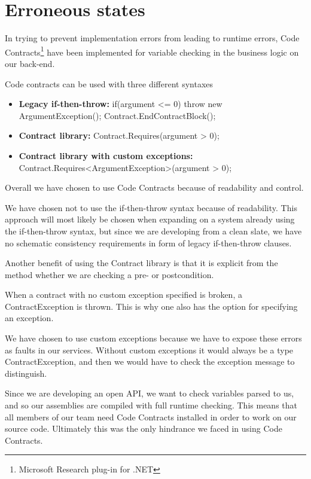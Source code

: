 \documentclass[../report.tex]{subfiles}
\begin{document}
\section{Erroneous states}

In trying to prevent implementation errors from leading to runtime errors, Code Contracts\footnote{Microsoft Research plug-in for .NET} have been implemented for variable checking in the business logic on our back-end.

Code contracts can be used with three different syntaxes

\begin{itemize}
\item \textbf{Legacy if-then-throw:}
\subitem if(argument <= 0) throw new ArgumentException();  
\subitem Contract.EndContractBlock();

\item \textbf{Contract library:}
\subitem Contract.Requires(argument > 0);

\item \textbf{Contract library with custom exceptions:}
\subitem Contract.Requires<ArgumentException>(argument > 0);
\end{itemize}

Overall we have chosen to use Code Contracts because of readability and control.

We have chosen not to use the if-then-throw syntax because of readability. This approach will most likely be chosen when expanding on a system already using the if-then-throw syntax, but since we are developing from a clean slate, we have no schematic consistency requirements in form of legacy if-then-throw clauses.

Another benefit of using the Contract library is that it is explicit from the method whether we are checking a pre- or postcondition.

When a contract with no custom exception specified is broken, a ContractException is thrown. This is why one also has the option for specifying an exception.

We have chosen to use custom exceptions because we have to expose these errors as faults in our services. Without custom exceptions it would always be a type ContractException, and then we would have to check the exception message to distinguish.

Since we are developing an open API, we want to check variables parsed to us, and so our assemblies are compiled with full runtime checking. This means that all members of our team need Code Contracts installed in order to work on our source code. Ultimately this was the only hindrance we faced in using Code Contracts.
\end{document}
